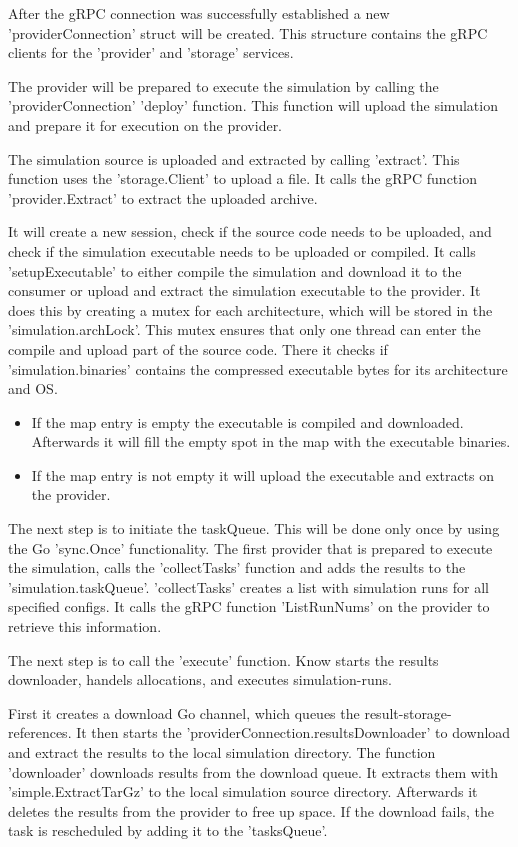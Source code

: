 After the gRPC connection was successfully established a new 'providerConnection' struct will be created. This structure contains the gRPC clients for the 'provider' and 'storage' services. 

The provider will be prepared to execute the simulation by calling the 'providerConnection' 'deploy' function. This function will upload the simulation and prepare it for execution on the provider.

The simulation source is uploaded and extracted by calling 'extract'. This function uses the 'storage.Client' to upload a file. It calls the gRPC function 'provider.Extract' to extract the uploaded archive.

It will create a new session, check if the source code needs to be uploaded, and check if the simulation executable needs to be uploaded or compiled. It calls 'setupExecutable' to either compile the simulation and download it to the consumer or upload and extract the simulation executable to the provider. It does this by creating a mutex for each architecture, which will be stored in the 'simulation.archLock'. This mutex ensures that only one thread can enter the compile and upload part of the source code. There it checks if 'simulation.binaries' contains the compressed executable bytes for its architecture and OS.
\begin{itemize}
    \item If the map entry is empty the executable is compiled and downloaded. Afterwards it will fill the empty spot in the map with the executable binaries.
    \item If the map entry is not empty it will upload the executable and extracts on the provider.
\end{itemize}

The next step is to initiate the taskQueue. This will be done only once by using the Go 'sync.Once' functionality. The first provider that is prepared to execute the simulation, calls the 'collectTasks' function and adds the results to the 'simulation.taskQueue'. 'collectTasks' creates a list with simulation runs for all specified configs. It calls the gRPC function 'ListRunNums' on the provider to retrieve this information.

The next step is to call the 'execute' function. Know starts the results downloader, handels allocations, and executes simulation-runs.

First it creates a download Go channel, which queues the result-storage-references. It then starts the 'providerConnection.resultsDownloader' to download and extract the results to the local simulation directory. The function 'downloader' downloads results from the download queue. It extracts them with 'simple.ExtractTarGz' to the local simulation source directory. Afterwards it deletes the results from the provider to free up space. If the download fails, the task is rescheduled by adding it to the 'tasksQueue'.

